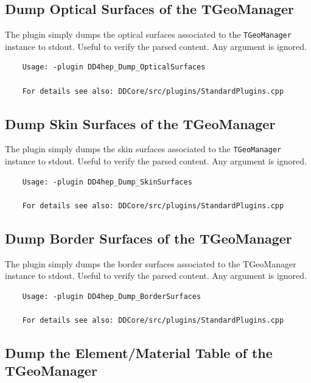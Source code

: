 \subsection{Dump Optical Surfaces of the TGeoManager}
\label{sec:dd4hep-manual-plugin-dump-optical-surfaces}

The plugin simply dumps the optical surfaces associated to the \texttt{TGeoManager} instance to stdout.
Useful to verify the parsed content.
Any argument is ignored.
\begin{verbatim}
    Usage: -plugin DD4hep_Dump_OpticalSurfaces

    For details see also: DDCore/src/plugins/StandardPlugins.cpp
\end{verbatim}

\subsection{Dump Skin Surfaces of the TGeoManager}
\label{sec:dd4hep-manual-plugin-dump-skin-surfaces}

The plugin simply dumps the skin surfaces associated to the \texttt{TGeoManager} instance to stdout.
Useful to verify the parsed content.
Any argument is ignored.
\begin{verbatim}
    Usage: -plugin DD4hep_Dump_SkinSurfaces

    For details see also: DDCore/src/plugins/StandardPlugins.cpp
\end{verbatim}

\subsection{Dump Border Surfaces of the TGeoManager}
\label{sec:dd4hep-manual-plugin-dump-border-surfaces}

The plugin simply dumps the border surfaces associated to the TGeoManager instance to stdout.
Useful to verify the parsed content.
Any argument is ignored.
\begin{verbatim}
    Usage: -plugin DD4hep_Dump_BorderSurfaces

    For details see also: DDCore/src/plugins/StandardPlugins.cpp
\end{verbatim}

\subsection{Dump the Element/Material Table of the TGeoManager}
\label{sec:dd4hep-manual-plugin-dump-material-table}


